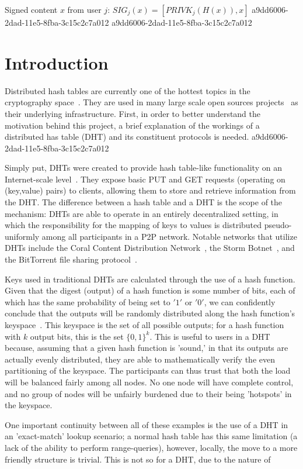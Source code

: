 \documentclass[12pt]{article}
\begin{document}
Signed content $x$ from user $j$: $SIG_j(x) = \left[ PRIVK_j( H(x) ), x \right]$
a9dd6006-2dad-11e5-8fba-3c15c2c7a012
a9dd6006-2dad-11e5-8fba-3c15c2c7a012\section{Introduction}
\par Distributed hash tables are currently one of the hottest topics in the cryptography space~\cite{Stoica:2001dj,Rowstron:2001ea,Ratnasamy:2001wn}. They are used in many large scale open sources projects~\cite{Freitas:2013tb,Xu:2010vs,Perfitt:2010fh} as their underlying infrastructure. First, in order to better understand the motivation behind this project, a brief explanation of the workings of a distributed has table (DHT) and its constituent protocols is needed.
a9dd6006-2dad-11e5-8fba-3c15c2c7a012
\par Simply put, DHTs were created to provide hash table-like functionality on an Internet-scale level~\cite{Ratnasamy:2001wn}. They expose basic PUT and GET requests (operating on (key,value) pairs) to clients, allowing them to store and retrieve information from the DHT. The difference between a hash table and a DHT is the scope of the mechanism: DHTs are able to operate in an entirely decentralized setting, in which the responsibility for the mapping of keys to values is distributed pseudo-uniformly among all participants in a P2P network. Notable networks that utilize DHTs include the Coral Content Distribution Network~\cite{Freedman:2004vb}, the Storm Botnet~\cite{Holz:2008uk}, and the BitTorrent file sharing protocol~\cite{Cohen:y1_8mBnw}.

\par Keys used in traditional DHTs are calculated through the use of a hash function. Given that the digest (output) of a hash function is some number of bits, each of which has the same probability of being set to $'1'$ or $'0'$, we can confidently conclude that the outputs will be randomly distributed along the hash function's keyspace~. This keyspace is the set of all possible outputs; for a hash function with $k$ output bits, this is the set $\{0,1\}^k$. This is useful to users in a DHT because, assuming that a given hash function is 'sound,' in that its outputs are actually evenly distributed, they are able to mathematically verify the even partitioning of the keyspace. The participants can thus trust that both the load will be balanced fairly among all nodes. No one node will have complete control, and no group of nodes will be unfairly burdened due to their being 'hotspots' in the keyspace.~

\par One important continuity between all of these examples is the use of a DHT in an 'exact-match' lookup scenario; a normal hash table has this same limitation (a lack of the ability to perform range-queries), however, locally, the move to a more friendly structure is trivial. This is not so for a DHT, due to the nature of
\printbibliography
\end{document}
